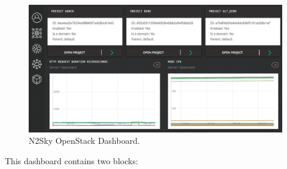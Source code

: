 \begin{figure}[H]
\begin{center}
  \includegraphics[width=\linewidth]{components/4/pics/openstack_dashboard.png}
  \caption{N2Sky OpenStack Dashboard.}
  \label{fig:openstack_dashboard}
\end{center}
\end{figure}
 

This dashboard contains two blocks:

